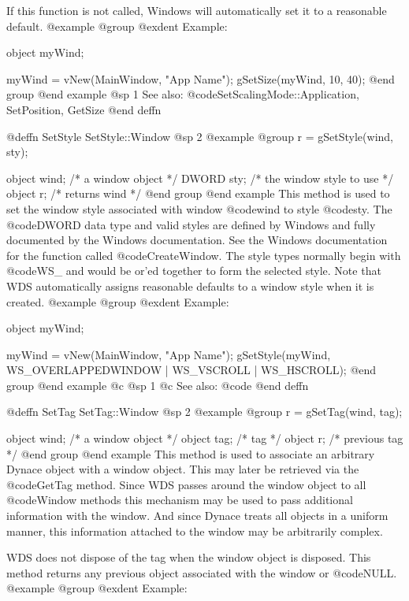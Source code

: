If this function is not called, Windows will automatically set it to a
reasonable default.
@example
@group
@exdent Example:

object  myWind;

myWind = vNew(MainWindow, "App Name");
gSetSize(myWind, 10, 40);
@end group
@end example
@sp 1
See also:  @code{SetScalingMode::Application, SetPosition, GetSize}
@end deffn









@deffn {SetStyle} SetStyle::Window
@sp 2
@example
@group
r = gSetStyle(wind, sty);

object  wind;   /*  a window object             */
DWORD   sty;    /*  the window style to use     */
object  r;      /*  returns wind                */
@end group
@end example
This method is used to set the window style associated with window
@code{wind} to style @code{sty}.  The @code{DWORD} data type and valid 
styles are defined by Windows and fully documented by the Windows
documentation.  See the Windows documentation for the function called
@code{CreateWindow}.  The style types normally begin with @code{WS_}
and would be or'ed together to form the selected style.
Note that WDS automatically assigns reasonable defaults to a window
style when it is created.
@example
@group
@exdent Example:

object  myWind;

myWind = vNew(MainWindow, "App Name");
gSetStyle(myWind, WS_OVERLAPPEDWINDOW | WS_VSCROLL | WS_HSCROLL);
@end group
@end example
@c @sp 1
@c See also:  @code{}
@end deffn








@deffn {SetTag} SetTag::Window
@sp 2
@example
@group
r = gSetTag(wind, tag);

object  wind;   /*  a window object   */
object  tag;    /*  tag               */
object  r;      /*  previous tag      */
@end group
@end example
This method is used to associate an arbitrary Dynace object with a
window object.  This may later be retrieved via the @code{GetTag} method.
Since WDS passes around the window object to all @code{Window} methods
this mechanism may be used to pass additional information with the
window.  And since Dynace treats all objects in a uniform manner, this
information attached to the window may be arbitrarily complex.

WDS does not dispose of the tag when the window object is disposed.
This method returns any previous object associated with the window or
@code{NULL}.
@example
@group
@exdent Example:

